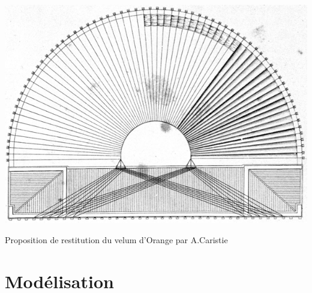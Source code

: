 \begin{figureth}
		\includegraphics[width=\linewidth]{images/velumCaristie}
		\caption[Velum]{Proposition de restitution du velum d'Orange par A.Caristie}
		\label{velumCaristie}
\end{figureth}		















\chapter{Modélisation}
		\minitoc
		\newpage
		
